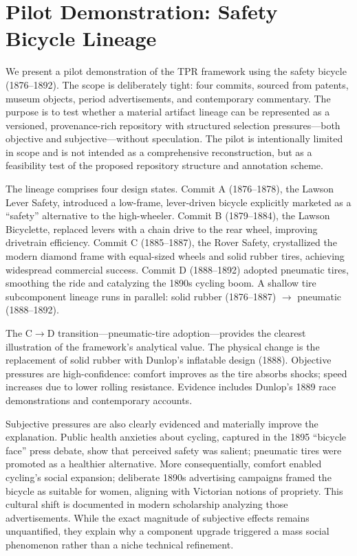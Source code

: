 \documentclass[11pt]{article}
\begin{document}
\section{Pilot Demonstration: Safety Bicycle Lineage}
We present a pilot demonstration of the TPR framework using the safety bicycle (1876--1892). The scope is deliberately tight: four commits, sourced from patents, museum objects, period advertisements, and contemporary commentary. The purpose is to test whether a material artifact lineage can be represented as a versioned, provenance-rich repository with structured selection pressures---both objective and subjective---without speculation. The pilot is intentionally limited in scope and is not intended as a comprehensive reconstruction, but as a feasibility test of the proposed repository structure and annotation scheme.

The lineage comprises four design states. Commit A (1876--1878), the Lawson Lever Safety, introduced a low-frame, lever-driven bicycle explicitly marketed as a ``safety'' alternative to the high-wheeler. Commit B (1879--1884), the Lawson Bicyclette, replaced levers with a chain drive to the rear wheel, improving drivetrain efficiency. Commit C (1885--1887), the Rover Safety, crystallized the modern diamond frame with equal-sized wheels and solid rubber tires, achieving widespread commercial success. Commit D (1888--1892) adopted pneumatic tires, smoothing the ride and catalyzing the 1890s cycling boom. A shallow tire subcomponent lineage runs in parallel: solid rubber (1876--1887) $\rightarrow$ pneumatic (1888--1892).

The C$\rightarrow$D transition---pneumatic-tire adoption---provides the clearest illustration of the framework's analytical value. The physical change is the replacement of solid rubber with Dunlop's inflatable design (1888). Objective pressures are high-confidence: comfort improves as the tire absorbs shocks; speed increases due to lower rolling resistance. Evidence includes Dunlop's 1889 race demonstrations and contemporary accounts.

Subjective pressures are also clearly evidenced and materially improve the explanation. Public health anxieties about cycling, captured in the 1895 ``bicycle face'' press debate, show that perceived safety was salient; pneumatic tires were promoted as a healthier alternative. More consequentially, comfort enabled cycling's social expansion; deliberate 1890s advertising campaigns framed the bicycle as suitable for women, aligning with Victorian notions of propriety. This cultural shift is documented in modern scholarship analyzing those advertisements. While the exact magnitude of subjective effects remains unquantified, they explain why a component upgrade triggered a mass social phenomenon rather than a niche technical refinement.
\end{document}
